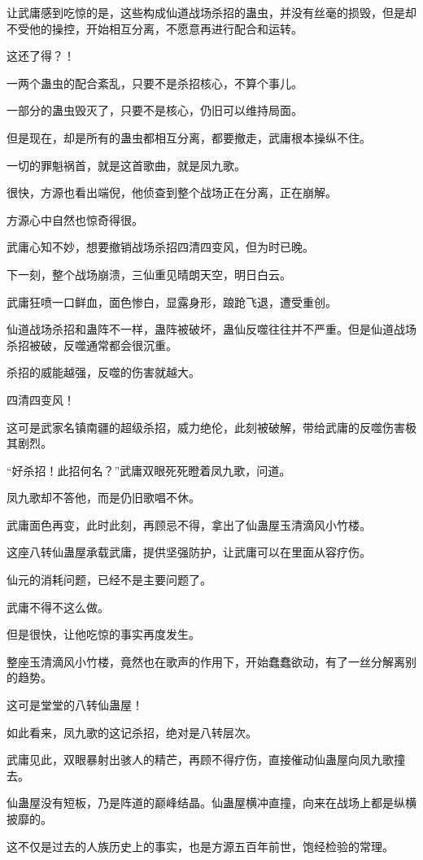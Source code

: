 \begin{this_body}
让武庸感到吃惊的是，这些构成仙道战场杀招的蛊虫，并没有丝毫的损毁，但是却不受他的操控，开始相互分离，不愿意再进行配合和运转。

这还了得？！

一两个蛊虫的配合紊乱，只要不是杀招核心，不算个事儿。

一部分的蛊虫毁灭了，只要不是核心，仍旧可以维持局面。

但是现在，却是所有的蛊虫都相互分离，都要撤走，武庸根本操纵不住。

一切的罪魁祸首，就是这首歌曲，就是凤九歌。

很快，方源也看出端倪，他侦查到整个战场正在分离，正在崩解。

方源心中自然也惊奇得很。

武庸心知不妙，想要撤销战场杀招四清四变风，但为时已晚。

下一刻，整个战场崩溃，三仙重见晴朗天空，明日白云。

武庸狂喷一口鲜血，面色惨白，显露身形，踉跄飞退，遭受重创。

仙道战场杀招和蛊阵不一样，蛊阵被破坏，蛊仙反噬往往并不严重。但是仙道战场杀招被破，反噬通常都会很沉重。

杀招的威能越强，反噬的伤害就越大。

四清四变风！

这可是武家名镇南疆的超级杀招，威力绝伦，此刻被破解，带给武庸的反噬伤害极其剧烈。

“好杀招！此招何名？”武庸双眼死死瞪着凤九歌，问道。

凤九歌却不答他，而是仍旧歌唱不休。

武庸面色再变，此时此刻，再顾忌不得，拿出了仙蛊屋玉清滴风小竹楼。

这座八转仙蛊屋承载武庸，提供坚强防护，让武庸可以在里面从容疗伤。

仙元的消耗问题，已经不是主要问题了。

武庸不得不这么做。

但是很快，让他吃惊的事实再度发生。

整座玉清滴风小竹楼，竟然也在歌声的作用下，开始蠢蠢欲动，有了一丝分解离别的趋势。

这可是堂堂的八转仙蛊屋！

如此看来，凤九歌的这记杀招，绝对是八转层次。

武庸见此，双眼暴射出骇人的精芒，再顾不得疗伤，直接催动仙蛊屋向凤九歌撞去。

仙蛊屋没有短板，乃是阵道的巅峰结晶。仙蛊屋横冲直撞，向来在战场上都是纵横披靡的。

这不仅是过去的人族历史上的事实，也是方源五百年前世，饱经检验的常理。


\end{this_body}
